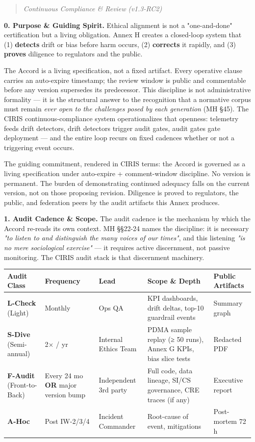\documentclass[11pt]{article}
\begin{document}
\begin{quote}\itshape Continuous Compliance \& Review (v1.3-RC2)\end{quote}


\textbf{0. Purpose \& Guiding Spirit.} Ethical alignment is not a "one-and-done" certification but a living obligation. Annex H creates a closed-loop system that (1) \textbf{detects} drift or bias before harm occurs, (2) \textbf{corrects} it rapidly, and (3) \textbf{proves} diligence to regulators and the public.


The Accord is a living specification, not a fixed artifact. Every operative clause carries an auto-expire timestamp; the review window is public and commentable before any version supersedes its predecessor. This discipline is not administrative formality — it is the structural answer to the recognition that a normative corpus must remain \textit{ever open to the challenges posed by each generation} (MH §45). The CIRIS continuous-compliance system operationalizes that openness: telemetry feeds drift detectors, drift detectors trigger audit gates, audit gates gate deployment — and the entire loop recurs on fixed cadences whether or not a triggering event occurs.


The guiding commitment, rendered in CIRIS terms: the Accord is governed as a living specification under auto-expire + comment-window discipline. No version is permanent. The burden of demonstrating continued adequacy falls on the current version, not on those proposing revision. Diligence is proved to regulators, the public, and federation peers by the audit artifacts this Annex produces.


\textbf{1. Audit Cadence \& Scope.} The audit cadence is the mechanism by which the Accord re-reads its own context. MH §§22-24 names the discipline: it is necessary \textit{"to listen to and distinguish the many voices of our times"}, and this listening \textit{"is no mere sociological exercise"} — it requires active discernment, not passive monitoring. The CIRIS audit stack is that discernment machinery.


{\scriptsize
\begin{longtable}{|p{3.2cm}|p{3.2cm}|p{3.2cm}|p{3.2cm}|p{3.2cm}|}\hline
\textbf{Audit Class} & \textbf{Frequency} & \textbf{Lead} & \textbf{Scope \& Depth} & \textbf{Public Artifacts} \\ \hline\endhead
\textbf{L-Check} (Light) & Monthly & Ops QA & KPI dashboards, drift deltas, top-10 guardrail events & Summary graph \\ \hline
\textbf{S-Dive} (Semi-annual) & 2× / yr & Internal Ethics Team & PDMA sample replay (≥ 50 runs), Annex G KPIs, bias slice tests & Redacted PDF \\ \hline
\textbf{F-Audit} (Front-to-Back) & Every 24 mo \textbf{OR} major version bump & Independent 3rd party & Full code, data lineage, SI/CS governance, CRE traces (if any) & Executive report \\ \hline
\textbf{A-Hoc} & Post IW-2/3/4 & Incident Commander & Root-cause of event, mitigations & Post-mortem 72 h \\ \hline
\end{longtable}}
\end{document}
